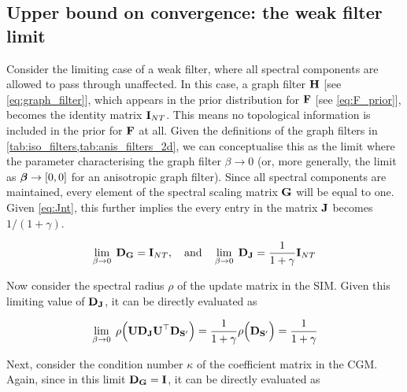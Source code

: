 \subsection{Upper bound on convergence: the weak filter limit}

Consider the limiting case of a weak filter, where all spectral components are allowed to pass through unaffected. In this case, a graph filter $\mathbf{H}$ [see \cref{eq:graph_filter}], which appears in the prior distribution for $\mathbf{F}$ [see \cref{eq:F_prior}], becomes the identity matrix $\mathbf{I}_{NT}$. This means no topological information is included in the prior for $\mathbf{F}$ at all. Given the definitions of the graph filters in \cref{tab:iso_filters,tab:anis_filters_2d}, we can conceptualise this as the limit where the parameter characterising the graph filter $\beta \rightarrow 0$ (or, more generally, the limit as $\boldsymbol{\beta} \rightarrow [0, 0]$ for an anisotropic graph filter). Since all spectral components are maintained, every element of the spectral scaling matrix $\mathbf{G}$ will be equal to one. Given \cref{eq:Jnt}, this further implies the every entry in the matrix $\mathbf{J}$ becomes $1 / (1 + \gamma)$. 

$$
\lim_{\beta \rightarrow 0} \; \mathbf{D}_{\mathbf{G}} = \mathbf{I}_{NT}, \quad \text{and} \quad \lim_{\beta \rightarrow 0} \; \mathbf{D}_{\mathbf{J}} = \frac{1}{1 + \gamma} \mathbf{I}_{NT}
$$

Now consider the spectral radius $\rho$ of the update matrix in the SIM. Given this limiting value of $\mathbf{D}_{\mathbf{J}}$, it can be directly evaluated as


\begin{equation}
    \lim_{\beta \rightarrow 0} \; \rho\Big(\mathbf{U} \mathbf{D}_{\mathbf{J}} \mathbf{U}^\top \mathbf{D}_{\mathbf{S}'} \Big)
    = \frac{1}{1 + \gamma} \rho\Big(\mathbf{D}_{\mathbf{S}'} \Big)
    = \frac{1}{1 + \gamma} \label{eq:beta_lim_0} 
\end{equation}


Next, consider the condition number $\kappa$ of the coefficient matrix in the CGM. Again, since in this limit $\mathbf{D}_{\mathbf{G}} = \mathbf{I}$, it can be directly evaluated as 




